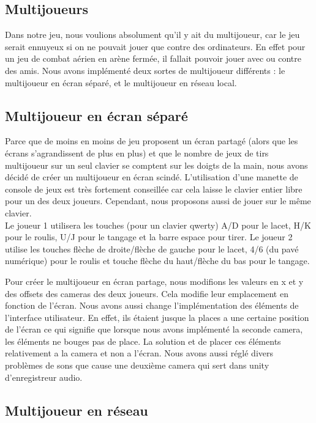 \documentclass[12pt, titlepage]{article}
\begin{document}
\begin{spacing}{1.5}
\newpage
\section{Multijoueurs}

Dans notre jeu, nous voulions absolument qu'il y ait du multijoueur, car le jeu serait ennuyeux si on ne pouvait jouer que contre des ordinateurs. En effet pour un jeu de combat aérien en arène fermée, il fallait pouvoir jouer avec ou contre des amis. Nous avons implémenté deux sortes de multijoueur différents : le multijoueur en écran séparé, et le multijoueur en réseau local.\\

\subsection{Multijoueur en écran séparé}

Parce que de moins en moins de jeu proposent un écran partagé (alors que les écrans s'agrandissent de plus en plus) et que le nombre de jeux de tirs multijoueur sur un seul clavier se comptent sur les doigts de la main, nous avons décidé de créer un multijoueur en écran scindé. L'utilisation d'une manette de console de jeux est très fortement conseillée car cela laisse le clavier entier libre pour un des deux joueurs. Cependant, nous proposons aussi de jouer sur le même clavier.\\

 Le joueur 1 utilisera les touches (pour un clavier qwerty) A/D pour le lacet, H/K pour le roulis, U/J pour le tangage et la barre espace pour tirer. Le joueur 2 utilise les touches flèche de droite/flèche de gauche pour le lacet, 4/6 (du pavé numérique) pour le roulis et touche flèche du haut/flèche du bas pour le tangage.

Pour créer le multijoueur en écran partage, nous modifions les valeurs en x et y des offsets des cameras des deux joueurs. Cela modifie leur emplacement en fonction de l'écran. Nous avons aussi change l'implémentation des éléments de l'interface utilisateur. En effet, ils étaient jusque la places a une certaine position de l'écran ce qui signifie que lorsque nous avons implémenté la seconde camera, les éléments ne bouges pas de place. La solution et de placer ces éléments relativement a la camera et non a l'écran. Nous avons aussi réglé divers problèmes de sons que cause une deuxième camera qui sert dans unity d'enregistreur audio.\\


\subsection{Multijoueur en réseau}


\end{spacing}
\end{document}
